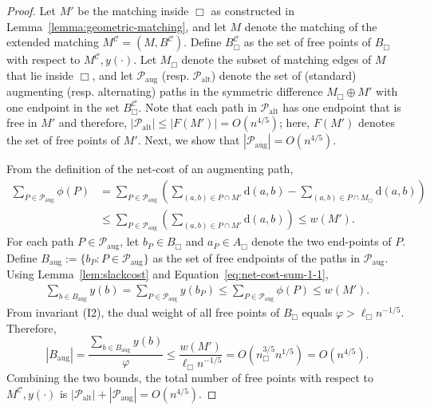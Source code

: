 \documentclass[11pt,onecolumn]{article}
\def\mcC{{\mathcal{C}}}
\def\mcP{{\mathcal{P}}}
\newcommand{\cell}{\Box}
\newcommand{\distance}[2]{\mathrm{d}(#1, #2)}
\newcommand{\ymax}{\varphi}
\begin{document}
\highMax*
\begin{proof}
    Let $M'$ be the matching inside $\cell$ as constructed in Lemma~\ref{lemma:geometric-matching}, and let $M$ denote the matching of the extended matching $M^\mcC=(M, B^\mcC)$.
    Define $B^\mcC_\cell$ as the set of free points of $B_\cell$ with respect to $M^\mcC,y(\cdot)$. Let $M_\cell$ denote the subset of matching edges of $M$ that lie inside $\cell$, and let $\mcP_{\mathrm{aug}}$ (resp. $\mcP_{\mathrm{alt}}$) denote the set of (standard) augmenting (resp. alternating) paths in the symmetric difference $M_\cell\oplus M'$ with one endpoint in the set $B^\mcC_\cell$. Note that each path in $\mcP_{\mathrm{alt}}$ has one endpoint that is free in $M'$ and therefore, $|\mcP_{\mathrm{alt}}|\le |F(M')|=O(n^{4/5})$; here, $F(M')$ denotes the set of free points of $M'$. Next, we show that $|\mcP_{\mathrm{aug}}|=O(n^{4/5})$.

    From the definition of the net-cost of an augmenting path,
    \begin{align}
        \sum_{P\in \mcP_{\mathrm{aug}}} \phi(P) &= \sum_{P\in \mcP_{\mathrm{aug}}} \left(\sum_{(a,b)\in P\cap M'}\distance{a}{b} - \sum_{(a,b)\in P\cap M_\cell}\distance{a}{b} \right)\nonumber\\ &\le \sum_{P\in \mcP_{\mathrm{aug}}} \left(\sum_{(a,b)\in P\cap M'}\distance{a}{b}\right)\le w(M').\label{eq:net-cost-sum-1-1}
    \end{align}
    For each path $P\in \mcP_{\mathrm{aug}}$, let $b_P\in B_\cell$ and $a_P\in A_\cell$ denote the two end-points of $P$. Define $B_{\mathrm{aug}}:=\{b_P:P\in \mcP_{\mathrm{aug}}\}$ as the set of free endpoints of the paths in $\mcP_{\mathrm{aug}}$. Using Lemma~\ref{lem:slackcost} and Equation~\eqref{eq:net-cost-sum-1-1}, 
    \begin{align}
        \sum_{b\in B_{\mathrm{aug}}} y(b) = \sum_{P\in \mcP_{\mathrm{aug}}} y(b_P)\le \sum_{P\in \mcP_{\mathrm{aug}}} \phi(P) \le w(M') .\label{eq:net-cost-sum-2-1}
    \end{align}
    From invariant (I2), the dual weight of all free points of $B_\cell$ equals $\ymax>\ell_\cell n^{-1/5}$. Therefore,
    \begin{equation*}\label{eq:net-cost-sum-2-2}
        |B_{\mathrm{aug}}| = \frac{\sum_{b\in B_{\mathrm{aug}}} y(b)}{\ymax} \le \frac{w(M')}{\ell_\cell n^{-1/5}}=O(n_\cell^{3/5}n^{1/5}) = O(n^{4/5}).
    \end{equation*}
    Combining the two bounds, the total number of free points with respect to $M^\mcC, y(\cdot)$ is $|\mcP_{\mathrm{alt}}|+|\mcP_{\mathrm{aug}}|=O(n^{4/5})$.
\end{proof}
\end{document}
